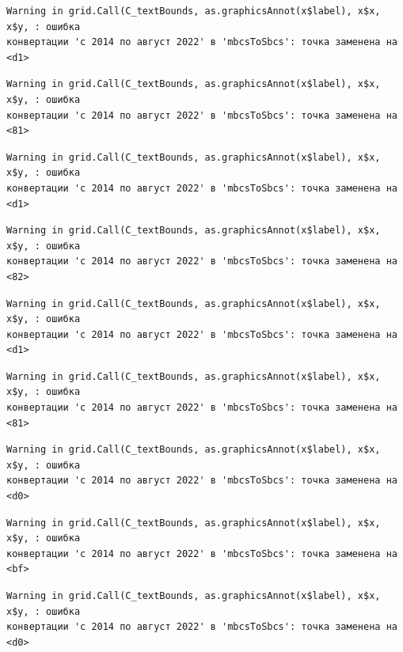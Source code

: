 \documentclass[
  letterpaper,
  DIV=11,
  numbers=noendperiod]{scrreprt}
\begin{document}
\begin{verbatim}
Warning in grid.Call(C_textBounds, as.graphicsAnnot(x$label), x$x, x$y, : ошибка
конвертации 'с 2014 по август 2022' в 'mbcsToSbcs': точка заменена на <d1>
\end{verbatim}

\begin{verbatim}
Warning in grid.Call(C_textBounds, as.graphicsAnnot(x$label), x$x, x$y, : ошибка
конвертации 'с 2014 по август 2022' в 'mbcsToSbcs': точка заменена на <81>
\end{verbatim}

\begin{verbatim}
Warning in grid.Call(C_textBounds, as.graphicsAnnot(x$label), x$x, x$y, : ошибка
конвертации 'с 2014 по август 2022' в 'mbcsToSbcs': точка заменена на <d1>
\end{verbatim}

\begin{verbatim}
Warning in grid.Call(C_textBounds, as.graphicsAnnot(x$label), x$x, x$y, : ошибка
конвертации 'с 2014 по август 2022' в 'mbcsToSbcs': точка заменена на <82>
\end{verbatim}

\begin{verbatim}
Warning in grid.Call(C_textBounds, as.graphicsAnnot(x$label), x$x, x$y, : ошибка
конвертации 'с 2014 по август 2022' в 'mbcsToSbcs': точка заменена на <d1>
\end{verbatim}

\begin{verbatim}
Warning in grid.Call(C_textBounds, as.graphicsAnnot(x$label), x$x, x$y, : ошибка
конвертации 'с 2014 по август 2022' в 'mbcsToSbcs': точка заменена на <81>
\end{verbatim}

\begin{verbatim}
Warning in grid.Call(C_textBounds, as.graphicsAnnot(x$label), x$x, x$y, : ошибка
конвертации 'с 2014 по август 2022' в 'mbcsToSbcs': точка заменена на <d0>
\end{verbatim}

\begin{verbatim}
Warning in grid.Call(C_textBounds, as.graphicsAnnot(x$label), x$x, x$y, : ошибка
конвертации 'с 2014 по август 2022' в 'mbcsToSbcs': точка заменена на <bf>
\end{verbatim}

\begin{verbatim}
Warning in grid.Call(C_textBounds, as.graphicsAnnot(x$label), x$x, x$y, : ошибка
конвертации 'с 2014 по август 2022' в 'mbcsToSbcs': точка заменена на <d0>
\end{verbatim}
\end{document}
